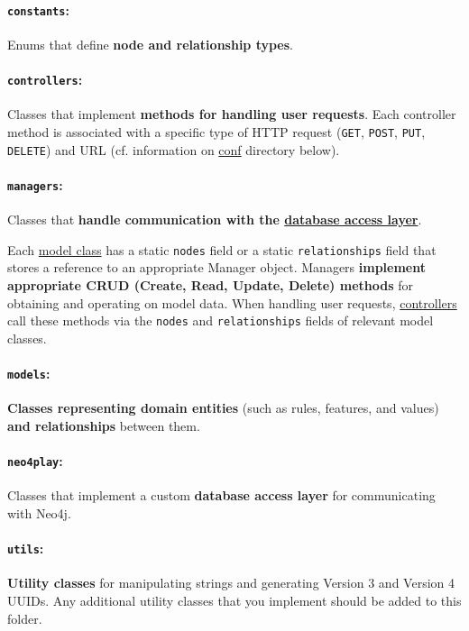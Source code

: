 \documentclass[11pt]{article}
\begin{document}
\paragraph{\texttt{constants}:}
\label{sec-3-3-1-1}
Enums that define \textbf{node and relationship types}.

\paragraph{\texttt{controllers}:}
\label{sec-3-3-1-2}
Classes that implement \textbf{methods for handling user requests}. Each
controller method is associated with a specific type of HTTP
request (\texttt{GET}, \texttt{POST}, \texttt{PUT}, \texttt{DELETE}) and URL (cf. information
on \href{https://github.com/itsjeyd/ODE#conf}{conf} directory below).

\paragraph{\texttt{managers}:}
\label{sec-3-3-1-3}
Classes that \textbf{handle communication with the \href{https://github.com/itsjeyd/ODE#neo4play}{database access layer}}.

Each \href{https://github.com/itsjeyd/ODE#models}{model class} has a static \texttt{nodes} field or a static
\texttt{relationships} field that stores a reference to an appropriate
Manager object. Managers \textbf{implement appropriate CRUD (Create,
Read, Update, Delete) methods} for obtaining and operating on
model data. When handling user requests, \href{https://github.com/itsjeyd/ODE#controllers}{controllers} call these
methods via the \texttt{nodes} and \texttt{relationships} fields of relevant
model classes.

\paragraph{\texttt{models}:}
\label{sec-3-3-1-4}
\textbf{Classes representing domain entities} (such as rules, features,
and values) \textbf{and relationships} between them.

\paragraph{\texttt{neo4play}:}
\label{sec-3-3-1-5}
Classes that implement a custom \textbf{database access layer} for
communicating with Neo4j.

\paragraph{\texttt{utils}:}
\label{sec-3-3-1-6}
\textbf{Utility classes} for manipulating strings and generating Version
3 and Version 4 UUIDs. Any additional utility classes that you
implement should be added to this folder.
\end{document}

